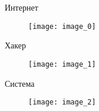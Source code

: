 \begin{frame}{Интернет}
	\begin{figure}[h!]
	\centering
	\texttt{[image: image\_0]}
\end{figure}
\end{frame}

\begin{frame}{Хакер}
	\begin{figure}[h!]
	\centering
	\texttt{[image: image\_1]}
\end{figure}
\end{frame}

\begin{frame}{Система}
	\begin{figure}[h!]
	\centering
	\texttt{[image: image\_2]}
\end{figure}
\end{frame}

